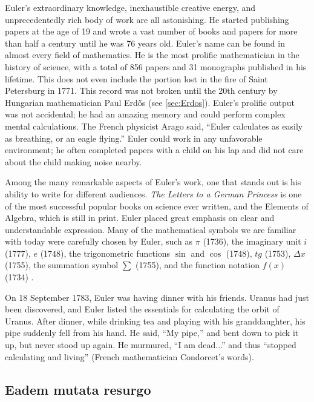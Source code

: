 \documentclass[b5paper]{article}
\begin{document}
\begin{mdframed}
Euler's extraordinary knowledge, inexhaustible creative energy, and unprecedentedly rich body of work are all astonishing. He started publishing papers at the age of 19 and wrote a vast number of books and papers for more than half a century until he was 76 years old. Euler's name can be found in almost every field of mathematics. He is the most prolific mathematician in the history of science, with a total of 856 papers and 31 monographs published in his lifetime. This does not even include the portion lost in the fire of Saint Petersburg in 1771. This record was not broken until the 20th century by Hungarian mathematician Paul Erdős (see \cref{sec:Erdos}). Euler's prolific output was not accidental; he had an amazing memory and could perform complex mental calculations. The French physicist Arago said, \enquote{Euler calculates as easily as breathing, or an eagle flying.} Euler could work in any unfavorable environment; he often completed papers with a child on his lap and did not care about the child making noise nearby.

Among the many remarkable aspects of Euler's work, one that stands out is his ability to write for different audiences. \emph{The Letters to a German Princess} is one of the most successful popular books on science ever written, and the Elements of Algebra, which is still in print. Euler placed great emphasis on clear and understandable expression. Many of the mathematical symbols we are familiar with today were carefully chosen by Euler, such as $\pi$ (1736), the imaginary unit $i$ (1777), $e$ (1748), the trigonometric functions $\sin$ and $\cos$ (1748), $tg$ (1753), $\Delta x$ (1755), the summation symbol $\sum$ (1755), and the function notation $f(x)$ (1734) \cite{HanXueTao2009}.

On 18 September 1783, Euler was having dinner with his friends. Uranus had just been discovered, and Euler listed the essentials for calculating the orbit of Uranus. After dinner, while drinking tea and playing with his granddaughter, his pipe suddenly fell from his hand. He said, \enquote{My pipe,} and bent down to pick it up, but never stood up again. He murmured, \enquote{I am dead...} and thus \enquote{stopped calculating and living} (French mathematician Condorcet's words).
\end{mdframed}

\subsection{Eadem mutata resurgo}
\end{document}
